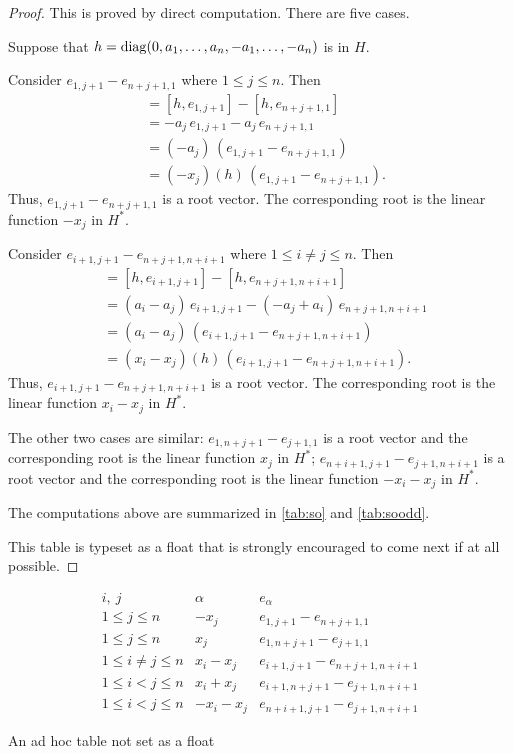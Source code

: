 \begin{proof}
  This is proved by direct computation. There are five cases.

  Suppose that $h={\operatorname{diag}(0,a_1,\dots,a_n, -a_1,\dots,-a_n)}$ is in $H$.

  Consider $e_{1, j+1}-e_{n+j+1,1}$ where $1\leq j\leq n$. Then
  \begin{align*}
    [h, e_{1, j+1}-e_{n+j+1,1}]& =[h,e_{1,j+1}] -[h,e_{n+j+1, 1}]\\
    &= -a_j\, e_{1,j+1} -a_{j} \, e_{n+j+1, 1} \\
    &= (-a_j)\, (e_{1, j+1}-e_{n+j+1,1}) \\
    &= (-x_j)(h) \, (e_{1, j+1}-e_{n+j+1,1}).
  \end{align*}
  Thus, $e_{1, j+1}-e_{n+j+1,1}$ is a root vector. The corresponding root is
  the linear function $-x_j$ in $H^*$.

  Consider $e_{i+1,j+1} -e_{n+j+1, n+i+1}$ where $1\leq i\ne j\leq n$. Then
  \begin{align*}
    [h, e_{i+1,j+1} -e_{n+j+1, n+i+1}]& =[h,e_{i+1,j+1}] -[h,e_{n+j+1,
      n+i+1}]\\
    &= (a_i-a_j)\, e_{i+1,j+1} - (-a_{j} + a_{i}) \, e_{n+j+1, n+i+1} \\
    &= (a_i-a_j)\, (e_{i+1,j+1} -e_{n+j+1, n+i+1}) \\
    &= (x_i-x_j)(h) \, (e_{i+1,j+1} -e_{n+j+1, n+i+1}).
  \end{align*}
  Thus, $e_{i+1,j+1} -e_{n+j+1, n+i+1}$ is a root vector. The corresponding
  root is the linear function $x_i-x_j$ in $H^*$.

  The other two cases are similar: $e_{1,n+j+1} -e_{j+1, 1}$ is a root
  vector and the corresponding root is the linear function $x_j$ in $H^*$;
  $e_{n+i+1,j+1} -e_{j+1, n+i+1}$ is a root vector and the corresponding
  root is the linear function $-x_i-x_j$ in $H^*$.

  The computations above are summarized in \cref{tab:so} and
  \cref{tab:soodd}. 

  This table is typeset as a float that is strongly encouraged to come next
  if at all possible.
\end{proof}


\begin{table}[h!tb]
  \small {}
  \renewcommand{\arraystretch}{1.3}
  \begin{equation*}
    \begin{array}{l|cc}
      i,\ j &\alpha &e_\alpha\\\hline
      1\leq j\leq n&-x_j & e_{1,j+1} -e_{n+j+1, 1}\\
      1\leq j\leq n&x_j & e_{1,n+j+1} -e_{j+1, 1}\\
      1\leq i\ne j\leq n&x_i-x_j &  e_{i+1,j+1} -e_{n+j+1, n+i+1} \\
      1\leq i< j\leq n&x_i+x_j & e_{i+1,n+j+1} -e_{j+1, n+i+1} \\ 
      1\leq i< j\leq n&-x_i-x_j & e_{n+i+1,j+1} -e_{j+1, n+i+1}
    \end{array}  
  \end{equation*}
  \caption{An ad hoc table not set as a float}\label{tab:so}
\end{table}


